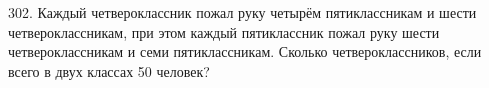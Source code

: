 302. Каждый четвероклассник пожал руку четырём пятиклассникам и шести четвероклассникам, при этом каждый пятиклассник пожал руку шести четвероклассникам и семи пятиклассникам. Сколько четвероклассников, если всего в двух классах 50 человек?\\
